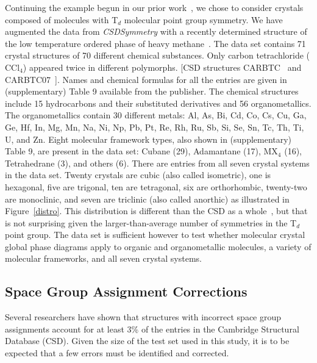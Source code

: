 \documentclass[preprint]{iucr}              %
\begin{document}
Continuing the example begun in our prior work~\cite{Mettes04}, we chose to consider crystals composed of molecules with T$_d$ molecular point group symmetry.  We have augmented the data from
\emph{CSDSymmetry} with a recently determined structure of the low temperature ordered phase of heavy methane~\cite{Neumann03}.  The data set contains 71 crystal structures of 70 different chemical substances.  Only carbon tetrachloride ($\mathrm{CCl}_4$) appeared twice in different polymorphs. [CSD structures CARBTC~\cite{Piermarini73} and CARBTC07~\cite{Cohen79}]. Names and chemical formulas for all the entries are given in (supplementary) Table 9 available from the publisher. The chemical structures include 15 hydrocarbons and their substituted derivatives and 56 organometallics. The organometallics contain 30 different metals: Al, As, Bi, Cd, Co, Cs, Cu, Ga, Ge, Hf, In, Mg, Mn, Na, Ni, Np, Pb, Pt, Re, Rh, Ru, Sb, Si, Se, Sn, Tc, Th, Ti, U, and Zn. Eight molecular framework types, also shown in (supplementary) Table 9, are present in the data set: Cubane (29), Adamantane (17), MX$_4$ (16), Tetrahedrane (3), and others (6). There are entries from all seven crystal systems in the data set. Twenty crystals are cubic (also called isometric), one is hexagonal, five are trigonal, ten are tetragonal, six are orthorhombic, twenty-two are monoclinic, and seven are triclinic (also called anorthic) as illustrated in Figure~\ref{distro}. This distribution is different than the CSD as a whole~\cite{Bauer92}, but that is not surprising given the larger-than-average number of symmetries in the T$_d$ point group.  The data set is sufficient however to test whether molecular crystal global phase diagrams apply to organic and organometallic molecules, a variety of molecular frameworks, and all seven crystal systems.


\subsection{Space Group Assignment Corrections}
\label{corrections}

Several researchers have shown that structures with incorrect space group assignments account for at least 3\% of the entries in the Cambridge Structural Database (CSD).\cite{Baur86,Marsh95}  Given the size of the test set used in this study, it is to be expected that a few errors must be identified and corrected.
\end{document}
